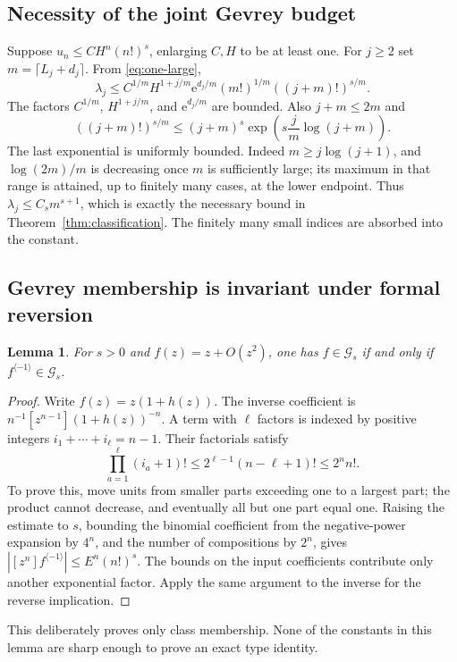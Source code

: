 \documentclass[11pt,a4paper]{article}
\numberwithin{equation}{section}
\newtheorem{lemma}[theorem]{Lemma}
\theoremstyle{definition}
\theoremstyle{remark}
\theoremstyle{definition}
\newcommand{\Gev}{\mathcal G}
\newcommand{\e}{\mathrm e}
\newcommand{\inv}{\langle-1\rangle}
\begin{document}
\subsection{Necessity of the joint Gevrey budget}
Suppose $u_n\le CH^n(n!)^s$, enlarging $C,H$ to be at least one. For
$j\ge2$ set $m=\lceil L_j+d_j\rceil$. From \eqref{eq:one-large},
\begin{equation}
 \lambda_j\le C^{1/m}H^{1+j/m}\e^{d_j/m}
                  (m!)^{1/m}((j+m)!)^{s/m}.
 \label{eq:necessary-estimate}
\end{equation}
The factors $C^{1/m}$, $H^{1+j/m}$, and $\e^{d_j/m}$ are bounded.
Also $j+m\le2m$ and
\[
 ((j+m)!)^{s/m}\le(j+m)^s
                \exp\!\left(s\frac j m\log(j+m)\right).
\]
The last exponential is uniformly bounded. Indeed $m\ge j\log(j+1)$,
and $\log(2m)/m$ is decreasing once $m$ is sufficiently large; its
maximum in that range is attained, up to finitely many cases, at the
lower endpoint. Thus $\lambda_j\le C_s m^{s+1}$, which is exactly the
necessary bound in Theorem~\ref{thm:classification}. The finitely many
small indices are absorbed into the constant.

\subsection{Gevrey membership is invariant under formal reversion}
\begin{lemma}
\label{lem:reversion}
For $s>0$ and $f(z)=z+O(z^2)$, one has
$f\in\Gev_s$ if and only if $f^{\inv}\in\Gev_s$.
\end{lemma}
\begin{proof}
Write $f(z)=z(1+h(z))$. The inverse coefficient is
$n^{-1}[z^{n-1}](1+h(z))^{-n}$. A term with $\ell$ factors is indexed by
positive integers $i_1+\cdots+i_\ell=n-1$. Their factorials satisfy
\[
 \prod_{a=1}^{\ell}(i_a+1)!
 \le2^{\ell-1}(n-\ell+1)!\le2^n n!.
\]
To prove this, move units from smaller parts exceeding one to a largest
part; the product cannot decrease, and eventually all but one part equal
one. Raising the estimate to $s$, bounding the binomial coefficient from
the negative-power expansion by $4^n$, and the number of compositions by
$2^n$, gives $|[z^n]f^{\inv}|\le E^n(n!)^s$. The bounds on the input
coefficients contribute only another exponential factor. Apply the same
argument to the inverse for the reverse implication.
\end{proof}
This deliberately proves only class membership. None of the constants
in this lemma are sharp enough to prove an exact type identity.
\end{document}

